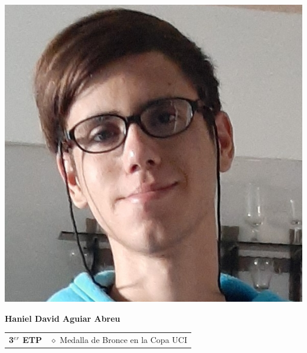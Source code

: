 \begin{minipage}{0.2\textwidth}
	\includegraphics[width=\linewidth]{img/concursantes/haniel.png} %
\end{minipage}
\hfill
\begin{minipage}{0.7\textwidth}
	\textbf{Haniel David Aguiar Abreu}
	
	\vspace*{0.1in}
	\begin{tabular}{rl}
		\textbf{3$^{er}$ ETP} & $\diamond$ Medalla de Bronce en la Copa UCI  \\
	\end{tabular}
\end{minipage}

\vspace*{0.2in}


